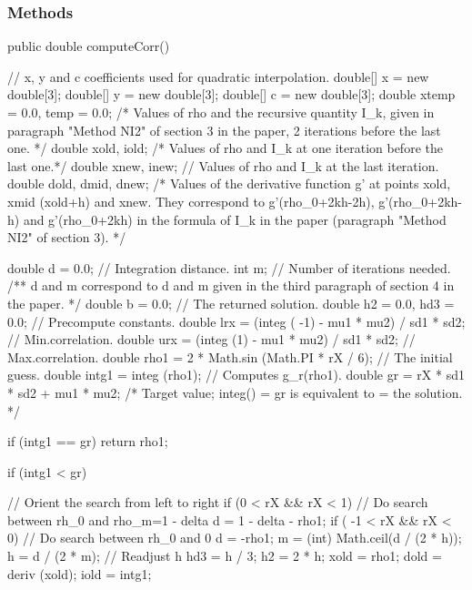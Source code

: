 \subsubsection* {Methods}
\begin{code}

   public double computeCorr()\begin{hide}
   {
      // x, y and c coefficients used for quadratic interpolation.
      double[] x = new double[3];
      double[] y = new double[3];
      double[] c = new double[3];
      double xtemp = 0.0, temp = 0.0; /* Values of rho and the recursive
      					   quantity I_k, given in paragraph
      					   "Method NI2" of section 3 in the
      					   paper, 2 iterations before the
      					   last one. */
      double xold, iold; /* Values of rho and I_k at one iteration before
      			      the last one.*/
      double xnew, inew; // Values of rho and I_k at the last iteration.
      double dold, dmid, dnew; /* Values of the derivative function g'
      				   at points xold, xmid (xold+h) and xnew.
      				   They correspond to g'(rho_0+2kh-2h),
      				   g'(rho_0+2kh-h) and g'(rho_0+2kh) in the
      				   formula of I_k in the paper
      				   (paragraph "Method NI2" of section 3). */

      double d = 0.0;   // Integration distance.
      int m;            // Number of iterations needed.
      /** d and m correspond to d and m given in the third paragraph of
          section 4 in the paper. */
      double b = 0.0; // The returned solution.
      double h2 = 0.0, hd3 = 0.0; // Precompute constants.
      double lrx = (integ ( -1) - mu1 * mu2) / sd1 * sd2; // Min.correlation.
      double urx = (integ (1) - mu1 * mu2) / sd1 * sd2; // Max.correlation.
      double rho1 = 2 * Math.sin (Math.PI * rX / 6); // The initial guess.
      double intg1 = integ (rho1); // Computes g_r(rho1).
      double gr = rX * sd1 * sd2 + mu1 * mu2; /* Target value; integ(\rho)
      						   = gr is equivalent to
      						   \rho = the solution. */

      if (intg1 == gr)
         return rho1;

      if (intg1 < gr) {         // Orient the search from left to right
         if (0 < rX && rX < 1) // Do search between rh_0 and rho_m=1 - delta
            d = 1 - delta - rho1;
         if ( -1 < rX && rX < 0) // Do search between rh_0 and 0
            d = -rho1;
         m = (int) Math.ceil(d / (2 * h));
         h = d / (2 * m); // Readjust h
         hd3 = h / 3;
         h2 = 2 * h;
         xold = rho1;
         dold = deriv (xold);
         iold = intg1;

}}
\end{hide}
\end{code}
